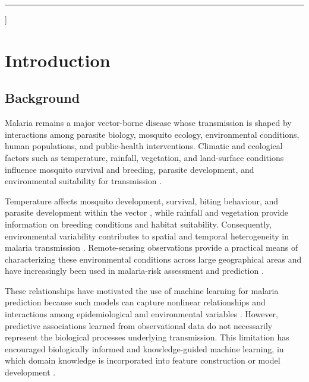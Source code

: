 \documentclass[10pt,twocolumn]{article}
\begin{document}
\vspace{0.7em}

\hrule

]



\section{Introduction}

\subsection{Background}

Malaria remains a major vector-borne disease whose transmission is
shaped by interactions among parasite biology, mosquito ecology,
environmental conditions, human populations, and public-health
interventions. Climatic and ecological factors such as temperature,
rainfall, vegetation, and land-surface conditions influence mosquito
survival and breeding, parasite development, and environmental
suitability for transmission
\parencite{LindsayBirley1996,MafweleLee2022,Odhiambo2020}.

Temperature affects mosquito development, survival, biting behaviour,
and parasite development within the vector
\parencite{Villena2022,Suh2024}, while rainfall and vegetation provide
information on breeding conditions and habitat suitability.
Consequently, environmental variability contributes to spatial and
temporal heterogeneity in malaria transmission
\parencite{Ferraguti2023,Rakotoarinia2022,Dahlin2024,
deSouzaWeaver2024}. Remote-sensing observations provide a practical
means of characterizing these environmental conditions across large
geographical areas and have increasingly been used in malaria-risk
assessment and prediction \parencite{Cuellar2025}.

These relationships have motivated the use of machine learning for
malaria prediction because such models can capture nonlinear
relationships and interactions among epidemiological and environmental
variables \parencite{Masinde2020,Odu2021,Khan2024,
RahmanShiddik2025}. However, predictive associations learned from
observational data do not necessarily represent the biological
processes underlying transmission. This limitation has encouraged
biologically informed and knowledge-guided machine learning, in which
domain knowledge is incorporated into feature construction or model
development \parencite{Wang2020,Yin2019,Jhutty2022,Karpatne2024}.
\end{document}
